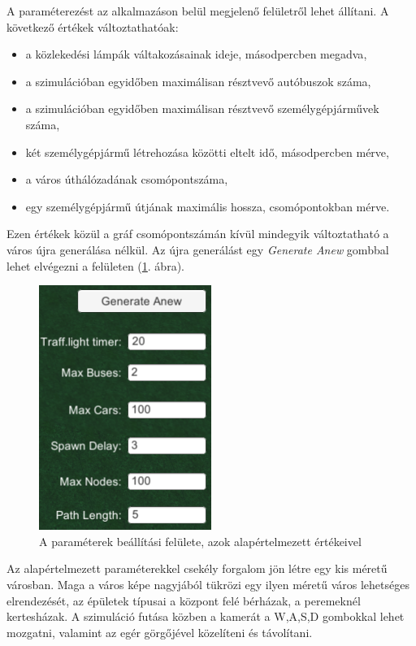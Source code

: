 
A paraméterezést az alkalmazáson belül megjelenő felületről lehet állítani. A következő értékek változtathatóak:
\begin{itemize}
\item{a közlekedési lámpák váltakozásainak ideje, másodpercben megadva},
\item{a szimulációban egyidőben maximálisan résztvevő autóbuszok száma},
\item{a szimulációban egyidőben maximálisan résztvevő személygépjárművek száma},
\item{két személygépjármű létrehozása közötti eltelt idő, másodpercben mérve},
\item{a város úthálózadának csomópontszáma},
\item{egy személygépjármű útjának maximális hossza, csomópontokban mérve}.
\end{itemize}
Ezen értékek közül a gráf csomópontszámán kívül mindegyik változtatható a város újra generálása nélkül. Az újra generálást egy \textit{Generate Anew} gombbal lehet elvégezni a felületen (\ref{fig:param}. ábra).
\begin{figure}[H]
\centering
\includegraphics[scale=1.0]{params.png}
\caption{A paraméterek beállítási felülete, azok alapértelmezett értékeivel}
\label{fig:param}
\end{figure}

Az alapértelmezett paraméterekkel csekély forgalom jön létre egy kis méretű városban. Maga a város képe nagyjából tükrözi egy ilyen méretű város lehetséges elrendezését, az épületek típusai a központ felé bérházak, a peremeknél kertesházak. A szimuláció futása közben a kamerát a W,A,S,D gombokkal lehet mozgatni, valamint az egér görgőjével közelíteni és távolítani.

